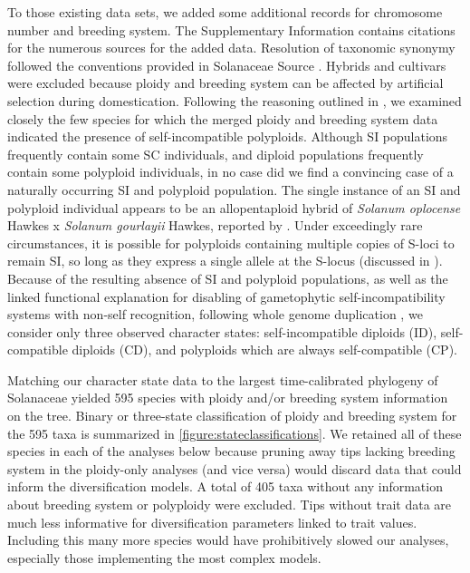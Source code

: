 To those existing data sets, we added some additional records for chromosome number and breeding system.
The Supplementary Information contains citations for the numerous sources for the added data. %
Resolution of taxonomic synonymy followed the conventions provided in Solanaceae Source \citep{solsource}. 
Hybrids and cultivars were excluded because ploidy and breeding system can be affected by artificial selection during domestication.
Following the reasoning outlined in \citet{robertson_2011}, we examined closely the few species for which the merged ploidy and breeding system data indicated the presence of self-incompatible polyploids.
Although SI populations frequently contain some SC individuals, and diploid populations frequently contain some polyploid individuals, in no case did we find a convincing case of a naturally occurring SI and polyploid population.
The single instance of an SI and polyploid individual appears to be an allopentaploid hybrid of {\em Solanum oplocense} Hawkes x {\em Solanum gourlayii} Hawkes, reported by \citealt{camadro_1981}.
Under exceedingly rare circumstances, it is possible for polyploids containing multiple copies of S-loci to remain SI, so long as they express a single allele at the S-locus (discussed in \citealt{robertson_2011}).
Because of the resulting absence of SI and polyploid populations, as well as the linked functional explanation for disabling of gametophytic self-incompatibility systems with non-self recognition, following whole genome duplication \citep[reviewed in][]{ramsey_1998,stone_2002}, we consider only three observed character states: self-incompatible diploids (ID), self-compatible diploids (CD), and polyploids which are always self-compatible (CP).

Matching our character state data to the largest time-calibrated phylogeny of Solanaceae \citep{sarkinen_2013} yielded 595 species with ploidy and/or breeding system information on the tree.
Binary or three-state classification of ploidy and breeding system for the 595 taxa is summarized in \cref{figure:stateclassifications}.
We retained all of these species in each of the analyses below because pruning away tips lacking breeding system in the ploidy-only analyses (and vice versa) would discard data that could inform the diversification models.
A total of 405 taxa without any information about breeding system or polyploidy were excluded.
Tips without trait data are much less informative for diversification parameters linked to trait values.
Including this many more species would have prohibitively slowed our analyses, especially those implementing the most complex models.

